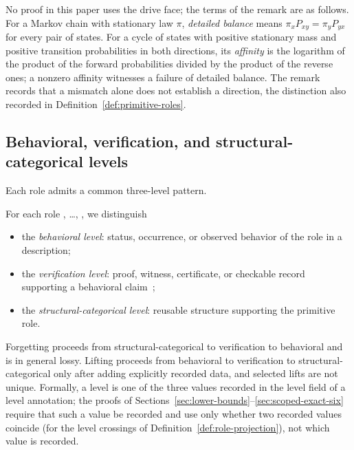 No proof in this paper uses the drive face; the terms of the remark are as
follows. For a Markov chain with stationary law \(\pi\), \emph{detailed balance}
means \(\pi_x P_{xy}=\pi_y P_{yx}\) for every pair of states. For a
cycle of states with positive stationary mass and positive transition
probabilities in both directions,
its \emph{affinity} is the logarithm of the product of the forward
probabilities divided by the product of the reverse ones; a nonzero
affinity witnesses a failure of detailed balance. The remark records that a \Pthree{} mismatch alone does
not establish a direction, the distinction also recorded in
Definition~\ref{def:primitive-roles}.

\subsection{Behavioral, verification, and structural-categorical levels}\label{subsec:levels}

Each role admits a common three-level pattern.

\begin{definition}\label{def:level-trichotomy}
For each role \Pone{}, \ldots, \Psix{}, we distinguish
\begin{itemize}[topsep=2pt,itemsep=1pt]
  \item the \emph{behavioral level}: status, occurrence, or observed
    behavior of the role in a description;
  \item the \emph{verification level}: proof, witness, certificate, or
    checkable record supporting a behavioral
    claim~\citep{MartinLof1984};
  \item the \emph{structural-categorical level}: reusable structure
    supporting the primitive role.
\end{itemize}
Forgetting proceeds from structural-categorical to verification to
behavioral and is in general lossy. Lifting proceeds from behavioral to
verification to structural-categorical only after adding explicitly
recorded data, and selected lifts are not unique. Formally, a level is one of
the three values recorded in the level field of a level annotation; the
proofs of Sections~\ref{sec:lower-bounds}--\ref{sec:scoped-exact-six} require
that such a value be recorded and use only whether two recorded values coincide
(for the level crossings of Definition~\ref{def:role-projection}), not which
value is recorded.
\end{definition}

